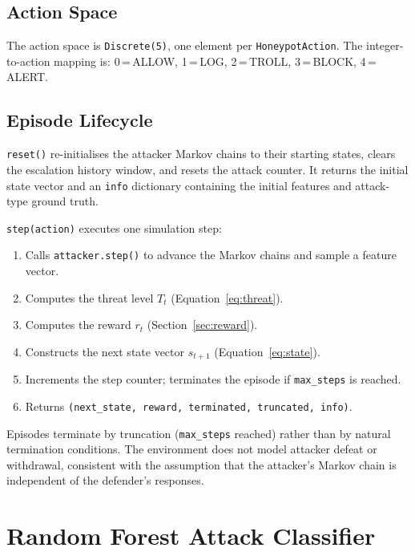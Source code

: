 \subsection{Action Space}

The action space is \texttt{Discrete(5)}, one element per \texttt{HoneypotAction}.
The integer-to-action mapping is: 0\,=\,ALLOW, 1\,=\,LOG, 2\,=\,TROLL,
3\,=\,BLOCK, 4\,=\,ALERT.

\subsection{Episode Lifecycle}

\texttt{reset()} re-initialises the attacker Markov chains to their starting
states, clears the escalation history window, and resets the attack counter.
It returns the initial state vector and an \texttt{info} dictionary containing
the initial features and attack-type ground truth.

\texttt{step(action)} executes one simulation step:
%
\begin{enumerate}
  \item Calls \texttt{attacker.step()} to advance the Markov chains and
        sample a feature vector.
  \item Computes the threat level $T_t$ (Equation~\ref{eq:threat}).
  \item Computes the reward $r_t$ (Section~\ref{sec:reward}).
  \item Constructs the next state vector $s_{t+1}$
        (Equation~\ref{eq:state}).
  \item Increments the step counter; terminates the episode if
        \texttt{max\_steps} is reached.
  \item Returns \texttt{(next\_state, reward, terminated, truncated, info)}.
\end{enumerate}

Episodes terminate by truncation (\texttt{max\_steps} reached) rather than
by natural termination conditions.
The environment does not model attacker defeat or withdrawal, consistent with
the assumption that the attacker's Markov chain is independent of the
defender's responses.

\section{Random Forest Attack Classifier}
\label{sec:classifier}

